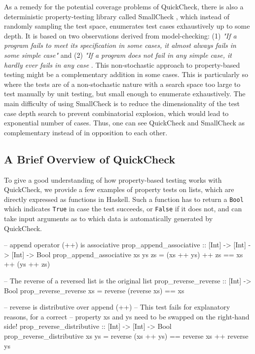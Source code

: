 As a remedy for the potential coverage problems of QuickCheck, there is also a deterministic property-testing library called SmallCheck \cite{runciman_smallcheck_2008}, which instead of randomly sampling the test space, enumerates test cases exhaustively up to some depth. It is based on two observations derived from model-checking: (1) \textit{"If a program fails to meet its specification in some cases, it almost always fails in some simple case"} and (2) \textit{"If a program does not fail in any simple case, it hardly ever fails in any case} \cite{runciman_smallcheck_2008}. This non-stochastic approach to property-based testing might be a complementary addition in some cases. This is particularly so where the tests are of a non-stochastic nature with a search space too large to test manually by unit testing, but small enough to enumerate exhaustively. The main difficulty of using SmallCheck is to reduce the dimensionality of the test case depth search to prevent combinatorial explosion, which would lead to exponential number of cases. Thus, one can see QuickCheck and SmallCheck as complementary instead of in opposition to each other.

\subsection{A Brief Overview of QuickCheck}
To give a good understanding of how property-based testing works with \\ QuickCheck, we provide a few examples of property tests on lists, which are directly expressed as functions in Haskell. Such a function has to return a \texttt{Bool} which indicates \texttt{True} in case the test succeeds, or \texttt{False} if it does not, and can take input arguments as to which data is automatically generated by QuickCheck. 

\begin{HaskellCode}
-- append operator (++) is associative
prop_append_associative :: [Int] -> [Int] -> [Int] -> Bool
prop_append_associative xs ys zs = (xs ++ ys) ++ zs == xs ++ (ys ++ zs)

-- The reverse of a reversed list is the original list
prop_reverse_reverse :: [Int] -> Bool
prop_reverse_reverse xs = reverse (reverse xs) == xs

-- reverse is distributive over append (++)
-- This test fails for explanatory reasons, for a correct 
-- property xs and ys need to be swapped on the right-hand side!
prop_reverse_distributive :: [Int] -> [Int] -> Bool
prop_reverse_distributive xs ys = reverse (xs ++ ys) == reverse xs ++ reverse ys
\end{HaskellCode}

